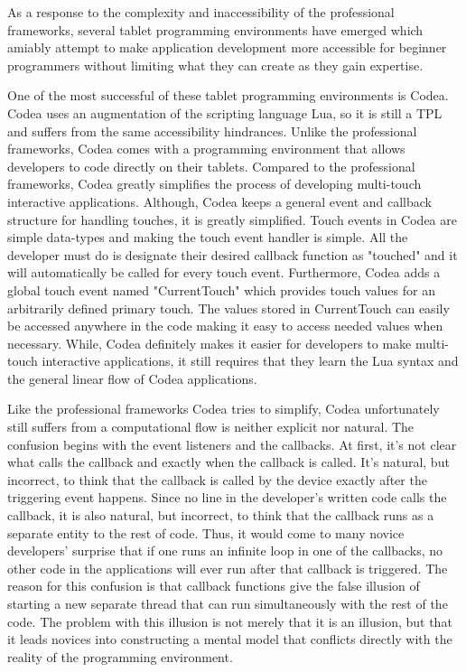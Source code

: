 As a response to the complexity and inaccessibility of the professional frameworks, several tablet programming environments have emerged which amiably attempt to make application development more accessible for beginner programmers without limiting what they can create as they gain expertise. 

One of the most successful of these tablet programming environments is Codea. Codea uses an augmentation of the scripting language Lua, so it is still a TPL and suffers from the same accessibility hindrances. Unlike the professional frameworks, Codea comes with a programming environment that allows developers to code directly on their tablets. Compared to the professional frameworks, Codea greatly simplifies the process of developing multi-touch interactive applications. Although, Codea keeps a general event and callback structure for handling touches, it is greatly simplified. Touch events in Codea are simple data-types and making the touch event handler is simple. All the developer must do is designate their desired callback function as "touched" and it will automatically be called for every touch event. Furthermore, Codea adds a global touch event named "CurrentTouch" which provides touch values for an arbitrarily defined primary touch. The values stored in CurrentTouch can easily be accessed anywhere in the code making it easy to access needed values when necessary. While, Codea definitely makes it easier for developers to make multi-touch interactive applications, it still requires that they learn the Lua syntax and the general linear flow of Codea applications. 

Like the professional frameworks Codea tries to simplify, Codea unfortunately still suffers from a computational flow is neither explicit nor natural. The confusion begins with the event listeners and the callbacks. At first, it's not clear what calls the callback and exactly when the callback is called. It's natural, but incorrect, to think that the callback is called by the device exactly after the triggering event happens. Since no line in the developer's written code calls the callback, it is also natural, but incorrect, to think that the callback runs as a separate entity to the rest of code. Thus, it would come to many novice developers' surprise that if one runs an infinite loop in one of the callbacks, no other code in the applications will ever run after that callback is triggered. The reason for this confusion is that callback functions give the false illusion of starting a new separate thread that can run simultaneously with the rest of the code. The problem with this illusion is not merely that it is an illusion, but that it leads novices into constructing a mental model that conflicts directly with the reality of the programming environment. 

